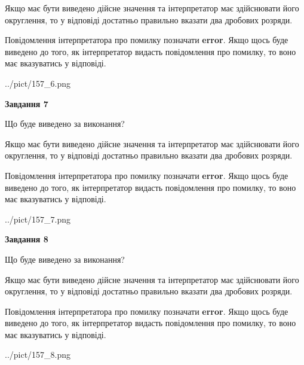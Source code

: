 \documentclass[12pt, ukrainian]{article}
\begin{document}
{\begin {Large}
Якщо має бути виведено дійсне значення та інтерпретатор має здійснювати його округлення, 
то у відповіді достатньо правильно вказати два дробових розряди.

Повідомлення інтерпретатора про помилку позначати \textbf{error}.
Якщо щось буде виведено до того, як інтерпретатор видасть повідомлення про помилку, 
то воно має вказуватись у відповіді. \par

\begin{center}
	{../pict/157_6.png}
\end{center}
\newpage

{\begin {center}\textbf{Завдання 7}\end {center}}\par
Що буде виведено за виконання? \par

Якщо має бути виведено дійсне значення та інтерпретатор має здійснювати його округлення, 
то у відповіді достатньо правильно вказати два дробових розряди.

Повідомлення інтерпретатора про помилку позначати \textbf{error}.
Якщо щось буде виведено до того, як інтерпретатор видасть повідомлення про помилку, 
то воно має вказуватись у відповіді. \par

\begin{center}
	{../pict/157_7.png}
\end{center}
\newpage

{\begin {center}\textbf{Завдання 8}\end {center}}\par
Що буде виведено за виконання? \par

Якщо має бути виведено дійсне значення та інтерпретатор має здійснювати його округлення, 
то у відповіді достатньо правильно вказати два дробових розряди.

Повідомлення інтерпретатора про помилку позначати \textbf{error}.
Якщо щось буде виведено до того, як інтерпретатор видасть повідомлення про помилку, 
то воно має вказуватись у відповіді. \par

\begin{center}
	{../pict/157_8.png}
\end{center}
\newpage


\end{Large}}
\end{document}
